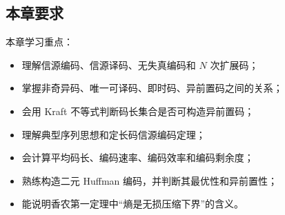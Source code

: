 \subsection{本章要求}
本章学习重点：
\begin{itemize}
  \item 理解信源编码、信源译码、无失真编码和 $N$ 次扩展码；
  \item 掌握非奇异码、唯一可译码、即时码、异前置码之间的关系；
  \item 会用 Kraft 不等式判断码长集合是否可构造异前置码；
  \item 理解典型序列思想和定长码信源编码定理；
  \item 会计算平均码长、编码速率、编码效率和编码剩余度；
  \item 熟练构造二元 Huffman 编码，并判断其最优性和异前置性；
  \item 能说明香农第一定理中“熵是无损压缩下界”的含义。
\end{itemize}
